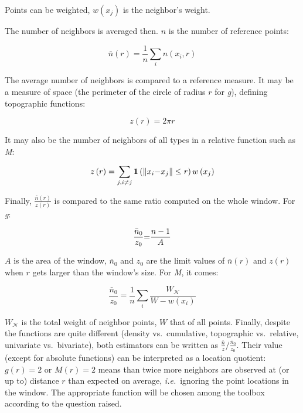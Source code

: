 \documentclass[nojss]{jss}
\begin{document}
Points can be weighted, $w(x_j)$ is the neighbor's weight.

The number of neighbors is averaged then. $n$ is the number of reference points:

\begin{equation}
  \bar{n}\left(r\right)=\frac{1}{n}\sum_i{n\left(x_i,r\right)}
\end{equation}

The average number of neighbors is compared to a reference measure. It may be a measure of space (the perimeter of the circle of radius $r$ for \emph{g}), defining topographic functions:

\begin{equation}
  z\left(r\right)=2 \pi r
\end{equation}

It may also be the number of neighbors of all types in a relative function such as \emph{M}:

\begin{equation}
  z\left(r\right)=\sum_{j,i\ne j}{{\mathbf 1}\left(\left\|x_i{\rm -}x_j\right\|\le r\right)w\left(x_j\right)}
\end{equation}

Finally, $\frac{\bar{n}(r)}{z(r)}$ is compared to the same ratio computed on the whole window. For \emph{g}:

\begin{equation}
   \frac{\bar{n}_0}{z_0}{\rm =}\frac{n-1}{A}
\end{equation}

$A$ is the area of the window, $\bar{n}_0$ and $z_0$ are the limit values of $\bar{n}(r)$ and $z(r)$ when $r$ gets larger than the window's size. For \emph{M}, it comes:

\begin{equation}
   \frac{{\bar{n}}_0}{z_0}=\frac{1}{n}\sum_i{\frac{W_\mathcal{N}}{W-w\left(x_i\right)}}
\end{equation}

$W_\mathcal{N}$ is the total weight of neighbor points, $W$ that of all points. Finally, despite the functions are quite different (density vs.\ cumulative, topographic vs.\ relative, univariate vs.\ bivariate), both estimators can be written as ${\frac{{\bar{n}}}{z}}/{\frac{{\bar{n}}_0}{z_0}}$. Their value (except for absolute functions) can be interpreted as a location quotient: $g(r)=2$ or $M(r)=2$ means than twice more neighbors are observed at (or up to) distance $r$ than expected on average, \emph{i.e.}\ ignoring the point locations in the window. The appropriate function will be chosen among the toolbox according to the question raised.
\end{document}
